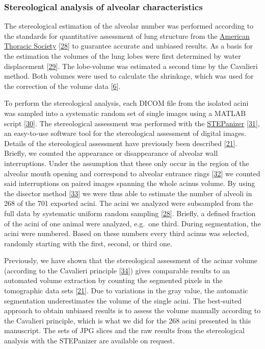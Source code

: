 \documentclass[
  american,
]{article}
\begin{document}
\hypertarget{stereological-analysis-of-alveolar-characteristics}{%
\subsubsection{Stereological analysis of alveolar characteristics}\label{stereological-analysis-of-alveolar-characteristics}}

The stereological estimation of the alveolar number was performed according to the standards for quantitative assessment of lung structure from the \href{http://www.thoracic.org/}{American Thoracic Society} {[}\protect\hyperlink{ref-dNc8FfNn}{28}{]} to guarantee accurate and unbiased results.
As a basis for the estimation the volumes of the lung lobes were first determined by water displacement {[}\protect\hyperlink{ref-KGbSQovR}{29}{]}.
The lobe-volume was estimated a second time by the Cavalieri method.
Both volumes were used to calculate the shrinkage, which was used for the correction of the volume data {[}\protect\hyperlink{ref-wnl86DEM}{6}{]}.

To perform the stereological analysis, each DICOM file from the isolated acini was sampled into a systematic random set of single images using a MATLAB script {[}\protect\hyperlink{ref-12Z2YPzm8}{30}{]}.
The stereological assessment was performed with the \href{http://stepanizer.com/}{STEPanizer} {[}\protect\hyperlink{ref-nPoQ2EIB}{31}{]}, an easy-to-use software tool for the stereological assessment of digital images.
Details of the stereological assessment have previously been described {[}\protect\hyperlink{ref-7YLeeyu}{21}{]}.
Briefly, we counted the appearance or disappearance of alveolar wall interruptions.
Under the assumption that these only occur in the region of the alveolar mouth opening and correspond to alveolar entrance rings {[}\protect\hyperlink{ref-QiAxY2i3}{32}{]} we counted said interruptions on paired images spanning the whole acinus volume.
By using the disector method {[}\protect\hyperlink{ref-FJ9FoB4m}{33}{]} we were thus able to estimate the number of alveoli in 268 of the 701 exported acini.
The acini we analyzed were subsampled from the full data by systematic uniform random sampling {[}\protect\hyperlink{ref-dNc8FfNn}{28}{]}.
Briefly, a defined fraction of the acini of one animal were analyzed, e.g.~one third.
During segmentation, the acini were numbered.
Based on these numbers every third acinus was selected, randomly starting with the first, second, or third one.

Previously, we have shown that the stereological assessment of the acinar volume (according to the Cavalieri principle {[}\protect\hyperlink{ref-FE9HLB4f}{34}{]}) gives comparable results to an automated volume extraction by counting the segmented pixels in the tomographic data sets {[}\protect\hyperlink{ref-7YLeeyu}{21}{]}.
Due to variations in the gray value, the automatic segmentation underestimates the volume of the single acini.
The best-suited approach to obtain unbiased results is to assess the volume manually according to the Cavalieri principle, which is what we did for the 268 acini presented in this manuscript.
The sets of JPG slices and the raw results from the stereological analysis with the STEPanizer are available on request.
\end{document}
